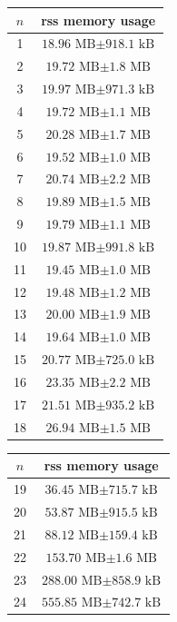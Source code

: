 \begin{table}[H]
    \centering
    \begin{tabular}{cc}
        $n$ & \gls{rss} memory usage \\
        \hline
        1 & $\text{18.96 MB} \pm \text{918.1 kB}$ \\
        2 & $\text{19.72 MB} \pm \text{1.8 MB}$ \\
        3 & $\text{19.97 MB} \pm \text{971.3 kB}$ \\
        4 & $\text{19.72 MB} \pm \text{1.1 MB}$ \\
        5 & $\text{20.28 MB} \pm \text{1.7 MB}$ \\
        6 & $\text{19.52 MB} \pm \text{1.0 MB}$ \\
        7 & $\text{20.74 MB} \pm \text{2.2 MB}$ \\
        8 & $\text{19.89 MB} \pm \text{1.5 MB}$ \\
        9 & $\text{19.79 MB} \pm \text{1.1 MB}$ \\
        10 & $\text{19.87 MB} \pm \text{991.8 kB}$ \\
        11 & $\text{19.45 MB} \pm \text{1.0 MB}$ \\
        12 & $\text{19.48 MB} \pm \text{1.2 MB}$ \\
        13 & $\text{20.00 MB} \pm \text{1.9 MB}$ \\
        14 & $\text{19.64 MB} \pm \text{1.0 MB}$ \\
        15 & $\text{20.77 MB} \pm \text{725.0 kB}$ \\
        16 & $\text{23.35 MB} \pm \text{2.2 MB}$ \\
        17 & $\text{21.51 MB} \pm \text{935.2 kB}$ \\
        18 & $\text{26.94 MB} \pm \text{1.5 MB}$ \\
    \end{tabular}
    \quad
    \begin{tabular}{cc}
        $n$ & \gls{rss} memory usage \\
        \hline
        19 & $\text{36.45 MB} \pm \text{715.7 kB}$ \\
        20 & $\text{53.87 MB} \pm \text{915.5 kB}$ \\
        21 & $\text{88.12 MB} \pm \text{159.4 kB}$ \\
        22 & $\text{153.70 MB} \pm \text{1.6 MB}$ \\
        23 & $\text{288.00 MB} \pm \text{858.9 kB}$ \\
        24 & $\text{555.85 MB} \pm \text{742.7 kB}$ \\

\end{tabular}
\end{table}
